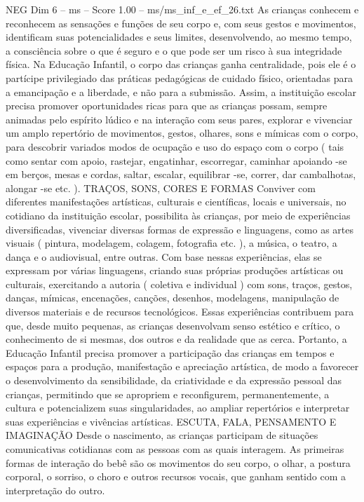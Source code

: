 \begin{textsample}{NEG Dim 6 – ms – Score 1.00 – ms/ms\_inf\_e\_ef\_26.txt}
As crianças conhecem e reconhecem as sensações e funções de seu corpo e, com seus gestos e movimentos, identificam suas potencialidades e seus limites, desenvolvendo, ao mesmo tempo, a consciência sobre o que é seguro e o que pode ser um risco à sua integridade física.
Na Educação Infantil, o corpo das crianças ganha centralidade, pois ele é o partícipe privilegiado das práticas pedagógicas de cuidado físico, orientadas para a emancipação e a liberdade, e não para a submissão.
Assim, a instituição escolar precisa promover oportunidades ricas para que as crianças possam, sempre animadas pelo espírito lúdico e na interação com seus pares, explorar e vivenciar um amplo repertório de movimentos, gestos, olhares, sons e mímicas com o corpo, para descobrir variados modos de ocupação e uso do espaço com o corpo ( tais como sentar com apoio, rastejar, engatinhar, escorregar, caminhar apoiando -se em berços, mesas e cordas, saltar, escalar, equilibrar -se, correr, dar cambalhotas, alongar -se etc. ).
TRAÇOS, SONS, CORES E FORMAS Conviver com diferentes manifestações artísticas, culturais e científicas, locais e universais, no cotidiano da instituição escolar, possibilita às crianças, por meio de experiências diversificadas, vivenciar diversas formas de expressão e linguagens, como as artes visuais ( pintura, modelagem, colagem, fotografia etc. ), a música, o teatro, a dança e o audiovisual, entre outras.
Com base nessas experiências, elas se expressam por várias linguagens, criando suas próprias produções artísticas ou culturais, exercitando a autoria ( coletiva e individual ) com sons, traços, gestos, danças, mímicas, encenações, canções, desenhos, modelagens, manipulação de diversos materiais e de recursos tecnológicos.
Essas experiências contribuem para que, desde muito pequenas, as crianças desenvolvam senso estético e crítico, o conhecimento de si mesmas, dos outros e da realidade que as cerca.
Portanto, a Educação Infantil precisa promover a participação das crianças em tempos e espaços para a produção, manifestação e apreciação artística, de modo a favorecer o desenvolvimento da sensibilidade, da criatividade e da expressão pessoal das crianças, permitindo que se apropriem e reconfigurem, permanentemente, a cultura e potencializem suas singularidades, ao ampliar repertórios e interpretar suas experiências e vivências artísticas.
ESCUTA, FALA, PENSAMENTO E IMAGINAÇÃO Desde o nascimento, as crianças participam de situações comunicativas cotidianas com as pessoas com as quais interagem.
As primeiras formas de interação do bebê são os movimentos do seu corpo, o olhar, a postura corporal, o sorriso, o choro e outros recursos vocais, que ganham sentido com a interpretação do outro.

\end{textsample}
